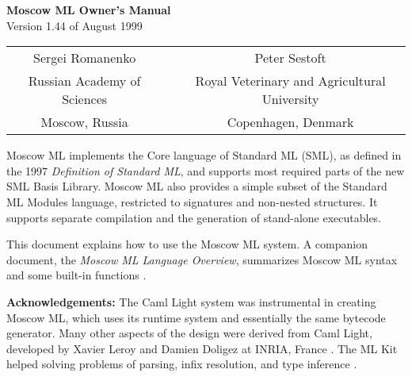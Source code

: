 \documentclass[fleqn]{article}
\begin{document}
\begin{center}

  {\huge\bf Moscow ML Owner's Manual}\\[0.5cm]

Version 1.44 of August 1999\\[0.7cm]

\begin{tabular}{ccc}
\large Sergei Romanenko && \large Peter Sestoft\\
Russian Academy of Sciences && Royal Veterinary and Agricultural University\\
Moscow, Russia && Copenhagen, Denmark
\end{tabular}

\end{center}

\vspace{0.5cm}

\noindent Moscow ML implements the Core language of Standard ML (SML),
as defined in the 1997 {\em Definition of Standard ML\/}, and supports
most required parts of the new SML Basis Library.  Moscow ML also
provides a simple subset of the Standard ML Modules language,
restricted to signatures and non-nested structures.  It supports
separate compilation and the generation of stand-alone executables.

This document explains how to use the Moscow ML system.  A companion
document, the {\em Moscow ML Language Overview\/}, summarizes Moscow
ML syntax and some built-in functions
\cite{MoscowML:1999:MoscowMLLanguage}.  

{\bf Acknowledgements:} The Caml Light system was instrumental in
creating Moscow ML, which uses its runtime system and essentially the
same bytecode generator.  Many other aspects of the design were
derived from Caml Light, developed by Xavier Leroy and Damien Doligez
at INRIA, France \cite{Leroy:1990:TheZinc,Leroy:1993:TheCaml}.  The ML
Kit helped solving problems of parsing, infix resolution, and type
inference \cite{Birkedal:1993:TheML}.

\vfill
\end{document}
